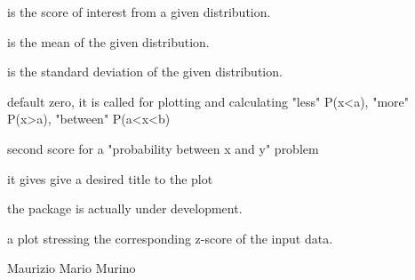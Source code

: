 \documentclass[a4paper]{book}
\begin{document}
\begin{Arguments}
\begin{ldescription}
\item[\code{my\_x}] is the score of interest from a given distribution.

\item[\code{myMean}] is the mean of the given distribution.

\item[\code{mySd}] is the standard deviation of the given distribution.

\item[\code{p}] default zero, it is called for plotting and calculating "less" P(x<a), "more" P(x>a), "between" P(a<x<b)

\item[\code{y}] second score for a "probability between x and y" problem

\item[\code{main}] it gives give a desired title to the plot
\end{ldescription}
\end{Arguments}
%
\begin{Details}\relax
the package is actually under development.
\end{Details}
%
\begin{Value}
a plot stressing the corresponding z-score of the input data.
\end{Value}
%
\begin{Author}\relax
Maurizio Mario Murino
\end{Author}
%
\begin{SeeAlso}\relax
{}
\end{SeeAlso}
\printindex{}
\end{document}
